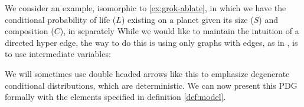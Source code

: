 \documentclass{article}
\theoremstyle{plain}
\theoremstyle{definition}
\newenvironment{example}
	{\pushQED{\qed}\renewcommand{\qedsymbol}{$\triangle$}\examplex}
	{\popQED\endexamplex%
}
\theoremstyle{remark}
\numberwithin{equation}{section}
\begin{document}
	\begin{example}%
		We consider an example, isomorphic to \ref{ex:grok-ablate}, in which we have the conditional probability of life ($L$) existing on a planet given its size ($S$) and composition ($C$), in separately 
		While we would like to maintain the intuition of a directed hyper edge, the way to do this is using only graphs with edges, as in , is to use intermediate variables:
		
		\begin{center}
		\end{center}
		We will sometimes use double headed arrows like this to emphasize degenerate conditional distributions, which are deterministic.
		We can now present this PDG formally with the elements specified in definition \ref{def:model}.
		

\end{example}
\end{document}
